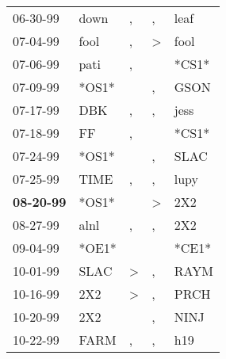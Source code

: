 \begin{supertabular}{p{0.07\textwidth}p{0.06\textwidth}p{0.02\textwidth}p{0.02\textwidth}p{0.06\textwidth}}
          06-30-99\textsuperscript{} &           down\textsuperscript{} &             , &             , &          leaf\textsuperscript{} \\
          07-04-99\textsuperscript{} &           fool\textsuperscript{} &             , &  \textgreater &          fool\textsuperscript{} \\
          07-06-99\textsuperscript{} &           pati\textsuperscript{} &             , &               &                           *CS1* \\
          07-09-99\textsuperscript{} &                            *OS1* &               &             , &          GSON\textsuperscript{} \\
          07-17-99\textsuperscript{} &            DBK\textsuperscript{} &             , &             , &          jess\textsuperscript{} \\
          07-18-99\textsuperscript{} &             FF\textsuperscript{} &             , &               &                           *CS1* \\
          07-24-99\textsuperscript{} &                            *OS1* &               &             , &          SLAC\textsuperscript{} \\
          07-25-99\textsuperscript{} &           TIME\textsuperscript{} &             , &             , &          lupy\textsuperscript{} \\
 \textbf{08-20-99\textsuperscript{}} &                            *OS1* &               &  \textgreater &           2X2\textsuperscript{} \\
          08-27-99\textsuperscript{} &           alnl\textsuperscript{} &             , &             , &           2X2\textsuperscript{} \\
          09-04-99\textsuperscript{} &                            *OE1* &               &               &                           *CE1* \\
          10-01-99\textsuperscript{} &           SLAC\textsuperscript{} &  \textgreater &             , &          RAYM\textsuperscript{} \\
          10-16-99\textsuperscript{} &            2X2\textsuperscript{} &  \textgreater &             , &          PRCH\textsuperscript{} \\
          10-20-99\textsuperscript{} &            2X2\textsuperscript{} &               &             , &          NINJ\textsuperscript{} \\
          10-22-99\textsuperscript{} &           FARM\textsuperscript{} &             , &             , &           h19\textsuperscript{} \\

\end{supertabular}
